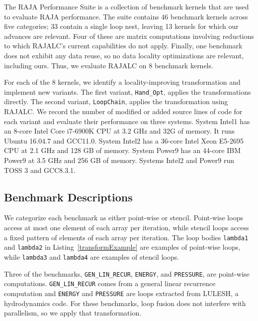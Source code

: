 The RAJA Performance Suite is a collection of benchmark kernels that are
used to evaluate RAJA performance.
The suite contains 46 benchmark kernels across five categories; 33 contain
a single loop nest, leaving 13 kernels for which our advances are relevant.
Four of these are matrix computations involving reductions to which 
RAJALC's current capabilities do not apply. 
Finally, one benchmark does not exhibit any data reuse, so no data locality 
optimizations are relevant, including ours. 
Thus, we evaluate RAJALC on 8 benchmark kernels.

For each of the 8 kernels, we identify a locality-improving transformation
and implement new variants.
The first variant, \verb.Hand_Opt., applies the transformations directly.
The second variant, \verb.LoopChain., applies the transformation using RAJALC.
We record the number of modified or added source lines of code for each
variant and evaluate their performance on three systems.
System Intel1 has an 8-core Intel Core i7-6900K CPU at 3.2 GHz and 32G of memory.
It runs Ubuntu 16.04.7 and GCC11.0.
System Intel2 has a 36-core Intel Xeon E5-2695 CPU at 2.1 GHz and 128 GB of memory.
System Power9 has an 44-core IBM Power9 at 3.5 GHz and 256 GB of memory.
Systems Intel2 and Power9 run TOSS 3 and GCC8.3.1.


\subsection{Benchmark Descriptions}

We categorize each benchmark as either point-wise or stencil. 
Point-wise loops access at most one element of each array per iteration,
while stencil loops access a fixed pattern of elements of each array per
iteration. 
The loop bodies
\verb.lambda1. and \verb.lambda2. in Listing~\ref{transformExample} are
examples of point-wise loops, while \verb.lambda3. and \verb.lambda4. are
examples of stencil loops.

Three of the benchmarks, \verb.GEN_LIN_RECUR., \verb.ENERGY., and
\verb.PRESSURE., are point-wise computations.
\verb.GEN_LIN_RECUR. comes from a general linear recurrence computation and
\verb.ENERGY. and \verb.PRESSURE. are loops extracted from LULESH, a
hydrodynamics code. 
For these benchmarks, loop fusion does not interfere with parallelism, so
we apply that transformation.

